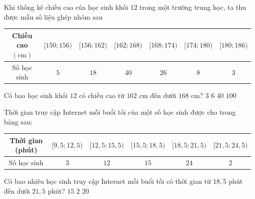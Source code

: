 \begin{ex}%
	Khi thống kê chiều cao của học sinh khối $12$ trong một trường trung học, ta thu được mẫu số liệu ghép nhóm sau
	\begin{center}
		\begin{tabular}{|c|c|c|c|c|c|c|}
			\hline Chiều cao $(\mathrm{cm})$ & {$[150 ; 156)$} & {$[156 ; 162)$} & {$[162 ; 168)$} & {$[168 ; 174)$} & {$[174 ; 180)$} & {$[180 ; 186)$} \\
			\hline Số học $\sinh$ & $5$ & $18$ & $40$ & $26$ & $8$ & $3$ \\
			\hline
		\end{tabular}
	\end{center}
	Có bao học sinh khối $12$ có chiều cao từ $162$ cm đến dưới $168$ cm?
	\choice
	{$3$}
	{$6$}
	{\True $40$}
	{$100$}
\end{ex}


\begin{ex}%
	Thời gian truy cập Internet mỗi buổi tối của một số học sinh được cho trong bảng sau:
	\begin{center}
		\begin{tabular}{|c|c|c|c|c|c|}
			\hline Thời gian (phút) & {$[9{,}5 ; 12{,}5)$} & {$[12{,}5 ; 15{,}5)$} & {$[15{,}5 ; 18{,}5)$} & {$[18{,}5 ; 21{,}5)$} & {$[21{,}5 ; 24{,}5)$} \\
			\hline Số học sinh & $3$ & $12$ & $15$ & $24$ & $2$ \\
			\hline
		\end{tabular}
	\end{center}
	Có bao nhiêu học sinh truy cập Internet mỗi buổi tối có thời gian từ $18{,}5$ phút đến dưới $21{,}5$ phút?
	{$15$}
	{$2$}
	{$20$}
\end{ex}

